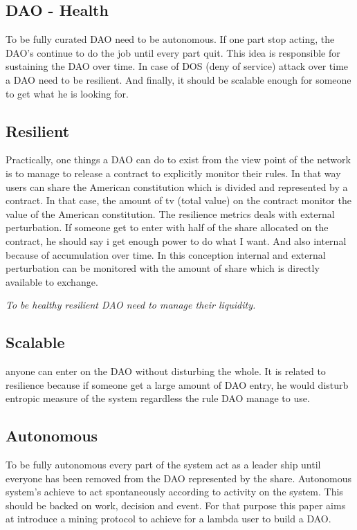 \documentclass{article}
\begin{document}
\begin{multicols}{2}[]
\section{DAO - Health}

To be fully curated DAO need to be autonomous. If one part stop acting, the DAO’s continue to do the job until every part quit. This idea is responsible for sustaining the DAO over time. In case of DOS (deny of service) attack over time a DAO need to be resilient. And finally, it should be scalable enough for someone to get what he is looking for.

\subsection{Resilient}

Practically, one things a DAO can do to exist from the view point of the network is to manage to release a contract to explicitly monitor their rules. In that way users can share the American constitution which is divided and represented by a contract. In that case, the amount of tv (total value) on the contract monitor the value of the American constitution. 
The resilience metrics deals with external perturbation. If someone get to enter with half of the share allocated on the contract, he should say i get enough power to do what I want. And also internal because of accumulation over time.
In this conception internal and external perturbation can be monitored with the amount of share which is directly available to exchange.

\emph{To be healthy resilient DAO need to manage their liquidity.}

\subsection{Scalable}
anyone can enter on the DAO without disturbing the whole. It is related to resilience because if someone get a large amount of DAO entry, he would disturb entropic measure of the system regardless the rule DAO manage to use. 
\subsection{Autonomous}
To be fully autonomous every part of the system act as a leader ship until everyone has been removed from the DAO represented by the share. Autonomous system’s achieve to act spontaneously according to activity on the system. This should be backed on work, decision and event.
For that purpose this paper aims at introduce a mining protocol to achieve for a lambda user to build a DAO.

\end{multicols}
\end{document}
